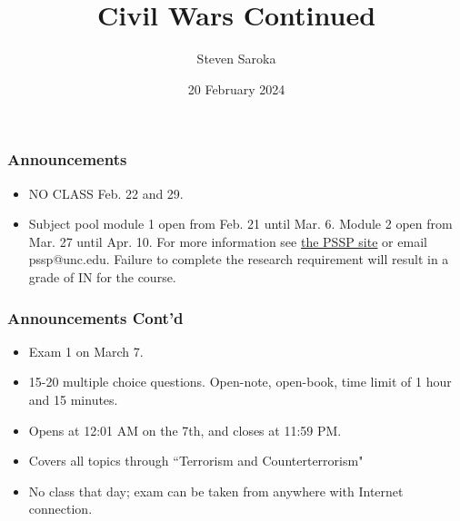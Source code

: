 \documentclass[handout]{beamer}
\title[Civil Wars 2]{\LARGE{Civil Wars Continued}}
\author[POLI 150]{Steven Saroka}
\institute{POLI 150}
\date{20 February 2024}
\begin{document}
\begin{frame}
\titlepage %
\end{frame}







	\begin{frame} 
	\frametitle{\LARGE{Announcements}}
	\begin{itemize}
		\item NO CLASS Feb. 22 and 29.
		\item Subject pool module 1 open from Feb. 21 until Mar. 6. Module 2 open from Mar. 27 until Apr. 10. For more information see \href{https://tarheels.live/psspparticipants/}{the PSSP site} or email pssp@unc.edu. Failure to complete the research requirement will result in a grade of IN for the course.
		
	\end{itemize}
\end{frame}

	\begin{frame} 
	\frametitle{\LARGE{Announcements Cont'd}}
	\begin{itemize}
		\item Exam 1 on March 7.
		\item 15-20 multiple choice questions. Open-note, open-book, time limit of 1 hour and 15 minutes.
		\item Opens at 12:01 AM on the 7th, and closes at 11:59 PM.
		\item Covers all topics through ``Terrorism and Counterterrorism"
		\item No class that day; exam can be taken from anywhere with Internet connection. 
		
	\end{itemize}
\end{frame}
\end{document}
